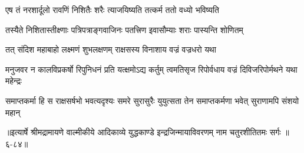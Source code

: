 \twolineshloka
{एष तं नरशार्दूलो रावणिं निशितैः शरैः}
{त्याजयिष्यति तत्कर्म ततो वध्यो भविष्यति} %

\twolineshloka
{तस्यैते निशितास्तीक्ष्णाः पत्रिपत्राङ्गवाजिनः}
{पतत्त्रिण इवासौम्याः शराः पास्यन्ति शोणितम्} %

\twolineshloka
{तत् संदिश महाबाहो लक्ष्मणं शुभलक्षणम्}
{राक्षसस्य विनाशाय वज्रं वज्रधरो यथा} %

\twolineshloka
{मनुजवर न कालविप्रकर्षो रिपुनिधनं प्रति यत्क्षमोऽद्य कर्तुम्}
{त्वमतिसृज रिपोर्वधाय वज्रं दिविजरिपोर्मथने यथा महेन्द्रः} %

\twolineshloka
{समाप्तकर्मा हि स राक्षसर्षभो भवत्यदृश्यः समरे सुरासुरैः}
{युयुत्सता तेन समाप्तकर्मणा भवेत् सुराणामपि संशयो महान्} %


॥इत्यार्षे श्रीमद्रामायणे वाल्मीकीये आदिकाव्ये युद्धकाण्डे इन्द्रजिन्मायाविवरणम् नाम चतुरशीतितमः सर्गः ॥६-८४॥
